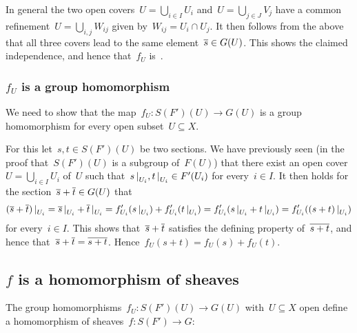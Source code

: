 In general the two open covers~$U = \bigcup_{i \in I} U_i$ and~$U = \bigcup_{j \in J} V_j$ have a common refinement~$U = \bigcup_{i,j} W_{ij}$ given by~$W_{ij} = U_i \cap U_j$.
It then follows from the above that all three covers lead to the same element~$\overline{s} \in G(U)$.
This shows the claimed independence, and hence that~$f_U$ is~{\welldef}.



\subsubsection*{$f_U$ is a group homomorphism}

We need to show that the map~$f_U \colon S(F')(U) \to G(U)$ is a group homomorphism for every open subset~$U \subseteq X$.

For this let~$s, t \in S(F')(U)$ be two sections.
We have previously seen (in the proof that~$S(F')(U)$ is a subgroup of~$F(U)$) that there exist an open cover~$U = \bigcup_{i \in I} U_i$ of~$U$ such that~$\restrict{s}{U_i}, \restrict{t}{U_i} \in F'(U_i)$ for every~$i \in I$.
It then holds for the section~$\overline{s} + \overline{t} \in G(U)$ that
\[
    \restrict{(\induced{s} + \induced{t})}{U_i}
  = \restrict{\induced{s}}{U_i} + \restrict{\induced{t}}{U_i}
  = f'_{U_i}(\restrict{s}{U_i}) + f'_{U_i}(\restrict{t}{U_i})
  = f'_{U_i}( \restrict{s}{U_i} + \restrict{t}{U_i} )
  = f'_{U_i}( \restrict{(s + t)}{U_i} )
\]
for every~$i \in I$.
This shows that~$\overline{s} + \overline{t}$ satisfies the defining property of~$\overline{s+t}$, and hence that~$\overline{s} + \overline{t} = \overline{s + t}$.
Hence~$f_U(s + t) = f_U(s) + f_U(t)$.



\subsection*{$f$ is a homomorphism of sheaves}

The group homomorphisms~$f_U \colon S(F')(U) \to G(U)$ with~$U \subseteq X$ open define a homomorphism of sheaves~$f \colon S(F') \to G$:

